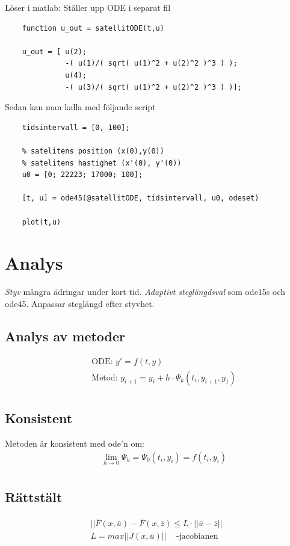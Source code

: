 Löser i matlab:\newline
Ställer upp ODE i separat fil
\begin{lstlisting}
    function u_out = satellitODE(t,u)

    u_out = [ u(2);
              -( u(1)/( sqrt( u(1)^2 + u(2)^2 )^3 ) );
              u(4);
              -( u(3)/( sqrt( u(1)^2 + u(2)^2 )^3 ) )];
\end{lstlisting}

Sedan kan man kalla med följande script
\begin{lstlisting}
    tidsintervall = [0, 100];
    
    % satelitens position (x(0),y(0))
    % satelitens hastighet (x'(0), y'(0))
    u0 = [0; 22223; 17000; 100];

    [t, u] = ode45(@satellitODE, tidsintervall, u0, odeset)

    plot(t,u)
\end{lstlisting}



\newpage
\section{Analys}
\textit{Styv} mångra ädringar under kort tid.
\textit{Adaptivt steglängdsval} som ode15s och ode45. Anpassar steglängd efter styvhet.

\subsection{Analys av metoder}
\begin{align*}
  &\quad  \text{ODE: } y'=f(t,y) \\
  &\quad  \text{Metod: } y_{i+1} = y_i +h\cdot{\Psi_k}(t_i, y_{i+1}, y_1) \\
\end{align*}

\subsection{Konsistent}
Metoden är konsistent med ode'n om:
\begin{align*}
  &\quad \lim_{h\to0} \Psi_h = \Psi_0(t_i,y_i) = f(t_i,y_i) \\
\end{align*}

\subsection{Rättstält}
\begin{align*}
  || \overline{F}(x,\overline{u})-\overline{F}(x,\overline{z}) \leq L\cdot||\overline{u}-\overline{z}|| \\
  L = max||J(x,\overline{u})|| \;\;\; \text{ -jacobianen}
\end{align*}

